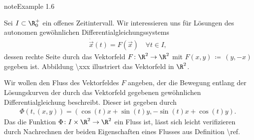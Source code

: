 \documentclass[letterpaper,10pt,german]{jupyterBook}
\begin{document}
\begin{sphinxadmonition}{note}{Example 1.6}



\sphinxAtStartPar
Sei \(I\subset \R_0^+\) ein offenes Zeitintervall.
Wir interessieren uns für Lösungen des autonomen gewöhnlichen Differentialgleichungssystems
\begin{equation*}
\begin{split}\dot{\vec{x}}(t) = F(\vec{x}) \quad \forall t\in I,\end{split}
\end{equation*}
\sphinxAtStartPar
dessen rechte Seite durch das Vektorfeld \(F \colon \R^2 \rightarrow \R^2\) mit \(F(x,y) \, \coloneqq \, (y, -x)\) gegeben ist.
Abbildung \textbackslash{}xxx illustriert das Vektorfeld in \(\R^2\).

\sphinxAtStartPar
Wir wollen den Fluss des Vektorfeldes \(F\) angeben, der die Bewegung entlang der Lösungskurven der durch das Vektorfeld gegebenen gewöhnlichen Differentialgleichung beschreibt.
Dieser ist gegeben durch
\begin{equation*}
\begin{split}\Phi(t,(x,y)) = (\cos(t)x + \sin(t)y, -\sin(t)x + \cos(t)y).\end{split}
\end{equation*}
\sphinxAtStartPar
Das die Funktion \(\Phi \colon I \times \R^2 \rightarrow \R^2\) ein Fluss ist, lässt sich leicht verifizieren durch Nachrechnen der beiden Eigenschaften eines Flusses aus Definition \textbackslash{}ref.


\end{sphinxadmonition}
\end{document}
